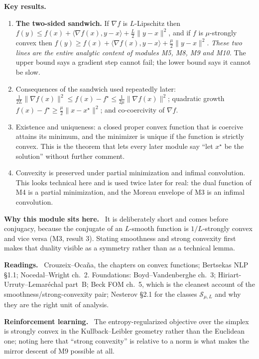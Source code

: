 \documentclass[11pt,a4paper]{article}
\newcommand{\mpart}[1]{\smallskip\noindent\textbf{#1}\ \ignorespaces}
\begin{document}
\mpart{Key results.}
\begin{enumerate}
\item \textbf{The two-sided sandwich.} If $\nabla f$ is $L$-Lipschitz then
$f(y) \le f(x) + \langle \nabla f(x), y-x\rangle + \tfrac L2\|y-x\|^2$, and if $f$ is
$\mu$-strongly convex then $f(y) \ge f(x) + \langle \nabla f(x), y-x\rangle +
\tfrac\mu2\|y-x\|^2$. \emph{These two lines are the entire analytic content of modules M5,
M8, M9 and M10.} The upper bound says a gradient step cannot fail; the lower bound says it
cannot be slow.
\item Consequences of the sandwich used repeatedly later: $\tfrac1{2L}\|\nabla f(x)\|^2 \le
f(x)-f^\star \le \tfrac1{2\mu}\|\nabla f(x)\|^2$; quadratic growth
$f(x)-f^\star \ge \tfrac\mu2\|x-x^\star\|^2$; and co-coercivity of $\nabla f$.
\item Existence and uniqueness: a closed proper convex function that is coercive attains its
minimum, and the minimizer is unique if the function is strictly convex. This is the theorem
that lets every later module say ``let $x^\star$ be the solution'' without further comment.
\item Convexity is preserved under partial minimization and infimal convolution. This looks
technical here and is used twice later for real: the dual function of M4 is a partial
minimization, and the Moreau envelope of M3 is an infimal convolution.
\end{enumerate}

\mpart{Why this module sits here.} It is deliberately short and comes before conjugacy,
because the conjugate of an $L$-smooth function is $1/L$-strongly convex and vice versa (M3,
result 3). Stating smoothness and strong convexity first makes that duality visible as a
symmetry rather than as a technical lemma.

\mpart{Readings.} Crouzeix--Oca\~na, the chapters on convex functions; Bertsekas NLP \S 1.1;
Nocedal--Wright ch.~2. Foundations: Boyd--Vandenberghe ch.~3;
Hiriart-Urruty--Lemar\'echal part~B; Beck FOM ch.~5, which is the cleanest account of the
smoothness/strong-convexity pair; Nesterov \S 2.1 for the classes $\mathcal{S}_{\mu,L}$ and
why they are the right unit of analysis.

\mpart{Reinforcement learning.} The entropy-regularized objective over the simplex is
strongly convex in the Kullback--Leibler geometry rather than the Euclidean one; noting here
that ``strong convexity'' is relative to a norm is what makes the mirror descent of M9
possible at all.
\end{document}
